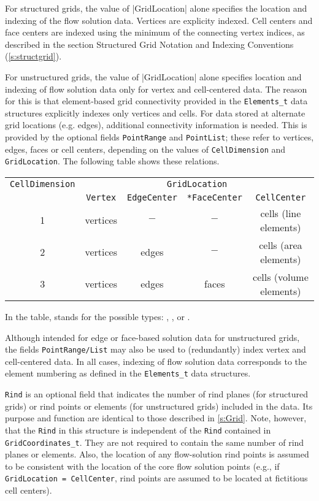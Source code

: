 \begin{changes}
For structured grids, the value of |GridLocation| alone specifies the location
and indexing of the flow solution data.  Vertices are explicity indexed.  Cell
centers and face centers are indexed using the minimum of the connecting vertex
indices, as described in the section Structured Grid Notation and Indexing
Conventions (\autoref{s:structgrid}).

For unstructured grids, the value of |GridLocation| alone specifies location and
indexing of flow solution data only for vertex and cell-centered data.  The
reason for this is that element-based grid connectivity provided in the
\texttt{Elements\_t} data structures explicitly indexes only vertices and cells.
For data stored at alternate grid locations (e.g. edges), additional
connectivity information is needed.  This is provided by the optional fields
\texttt{PointRange} and \texttt{PointList}; these refer to
vertices, edges, faces or cell centers, depending on the values of
\texttt{CellDimension} and \texttt{GridLocation}.  The following table shows
these relations.

\begin{center}
\begin{tabular}{||c|c|c|c|c||}
 \hline
\texttt{CellDimension} & \multicolumn{4}{c||}{\texttt{GridLocation}} \\
& \texttt{Vertex} & \texttt{EdgeCenter} & \texttt{*FaceCenter} & \texttt{CellCenter} \\
 \hline
1 & vertices & $-$ & $-$ & cells (line elements) \\
2 & vertices & edges & $-$ & cells (area elements) \\
3 & vertices & edges & faces & cells (volume elements) \\
 \hline
\end{tabular}
\end{center}

In the table,  stands for the possible types: ,
,  or .

Although intended for edge or face-based solution data for unstructured grids,
the fields \texttt{PointRange/List} may also be used to (redundantly) index
vertex and cell-centered data.  In all cases, indexing of flow solution data
corresponds to the element numbering as defined in the \texttt{Elements\_t} data
structures.
\end{changes}

\texttt{Rind} is an optional field that indicates
the number of rind planes (for structured grids) or rind points or
elements (for unstructured grids) included in the data.
Its purpose and function are identical to those described in
\autoref{s:Grid}.
Note, however, that the \texttt{Rind} in this structure is independent
of the \texttt{Rind} contained in \texttt{GridCoordinates\_t}.
They are not required to contain the same number of rind planes or
elements.
Also, the location of any flow-solution rind points is assumed to be
consistent with the location of the core flow solution points (e.g.,
if \texttt{GridLocation = CellCenter}, rind points are assumed to be
located at fictitious cell centers).

